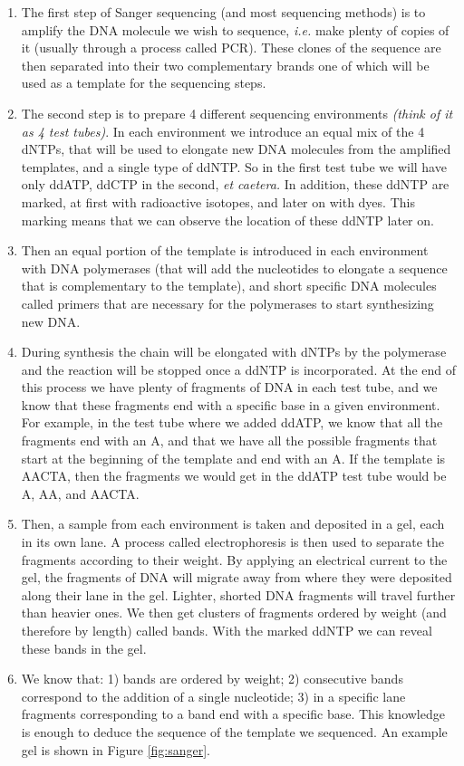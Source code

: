 \documentclass[
  11pt,
  twoside,
  BCOR=10mm,
  listof=totoc]{scrbook}
\providecommand{\tightlist}{%
  \setlength{\itemsep}{0pt}\setlength{\parskip}{0pt}}
\begin{document}
\begin{enumerate}
\def\labelenumi{\arabic{enumi}.}
\tightlist
\item
  The first step of Sanger sequencing (and most sequencing methods) is to amplify the DNA molecule we wish to sequence, \emph{i.e.} make plenty of copies of it (usually through a process called PCR). These clones of the sequence are then separated into their two complementary brands one of which will be used as a template for the sequencing steps.
\item
  The second step is to prepare 4 different sequencing environments \emph{(think of it as 4 test tubes)}. In each environment we introduce an equal mix of the 4 dNTPs, that will be used to elongate new DNA molecules from the amplified templates, and a single type of ddNTP. So in the first test tube we will have only ddATP, ddCTP in the second, \emph{et caetera.} In addition, these ddNTP are marked, at first with radioactive isotopes, and later on with dyes. This marking means that we can observe the location of these ddNTP later on.
\item
  Then an equal portion of the template is introduced in each environment with DNA polymerases (that will add the nucleotides to elongate a sequence that is complementary to the template), and short specific DNA molecules called primers that are necessary for the polymerases to start synthesizing new DNA.
\item
  During synthesis the chain will be elongated with dNTPs by the polymerase and the reaction will be stopped once a ddNTP is incorporated. At the end of this process we have plenty of fragments of DNA in each test tube, and we know that these fragments end with a specific base in a given environment. For example, in the test tube where we added ddATP, we know that all the fragments end with an A, and that we have all the possible fragments that start at the beginning of the template and end with an A. If the template is AACTA, then the fragments we would get in the ddATP test tube would be A, AA, and AACTA.
\item
  Then, a sample from each environment is taken and deposited in a gel, each in its own lane. A process called electrophoresis is then used to separate the fragments according to their weight. By applying an electrical current to the gel, the fragments of DNA will migrate away from where they were deposited along their lane in the gel. Lighter, shorted DNA fragments will travel further than heavier ones. We then get clusters of fragments ordered by weight (and therefore by length) called bands. With the marked ddNTP we can reveal these bands in the gel.
\item
  We know that: 1) bands are ordered by weight; 2) consecutive bands correspond to the addition of a single nucleotide; 3) in a specific lane fragments corresponding to a band end with a specific base. This knowledge is enough to deduce the sequence of the template we sequenced. An example gel is shown in Figure \ref{fig:sanger}.
\end{enumerate}
\end{document}
